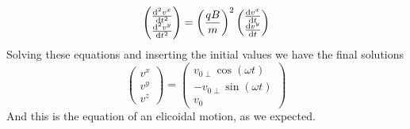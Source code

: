 \documentclass[../electromagnetism]{subfiles}
\begin{document}
\begin{equation}
	\begin{pmatrix}
		\dv[2]{v^x}{t}\\
		\dv[2]{v^y}{t}
	\end{pmatrix}=\left( \frac{qB}{m} \right)^2\begin{pmatrix}
		\dv{v^x}{t}\\
		\dv{v^y}{t}
	\end{pmatrix}
	\label{eq:hahafinal}
\end{equation}
Solving these equations and inserting the initial values we have the final solutions
\begin{equation}
	\begin{pmatrix}
		v^x\\
		v^y\\
		v^z
	\end{pmatrix}=\begin{pmatrix}
		v_{0\perp}\cos(\omega t)\\
		-v_{0\perp}\sin(\omega t)\\
		v_{0}
	\end{pmatrix}
	\label{eq:finalfuckit}
\end{equation}
And this is the equation of an elicoidal motion, as we expected.
\end{document}
